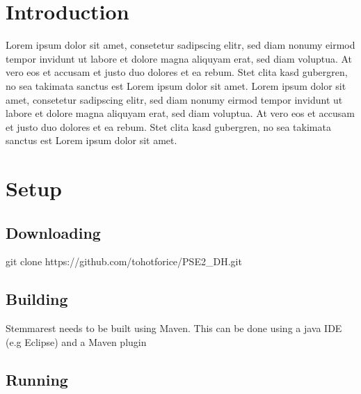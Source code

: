 \documentclass[11pt,fleqn,openany]{book} %
\begin{document}


\chapter{Introduction}

Lorem ipsum dolor sit amet, consetetur sadipscing elitr, sed diam nonumy eirmod tempor invidunt ut labore et dolore magna aliquyam erat, sed diam voluptua. At vero eos et accusam et justo duo dolores et ea rebum. Stet clita kasd gubergren, no sea takimata sanctus est Lorem ipsum dolor sit amet. Lorem ipsum dolor sit amet, consetetur sadipscing elitr, sed diam nonumy eirmod tempor invidunt ut labore et dolore magna aliquyam erat, sed diam voluptua. At vero eos et accusam et justo duo dolores et ea rebum. Stet clita kasd gubergren, no sea takimata sanctus est Lorem ipsum dolor sit amet.



\chapter{Setup}

\section*{Downloading}

git clone https://github.com/tohotforice/PSE2\_DH.git

\section*{Building}

Stemmarest needs to be built using Maven. This can be done using a java IDE (e.g Eclipse) and a Maven plugin

\section*{Running}
\end{document}
